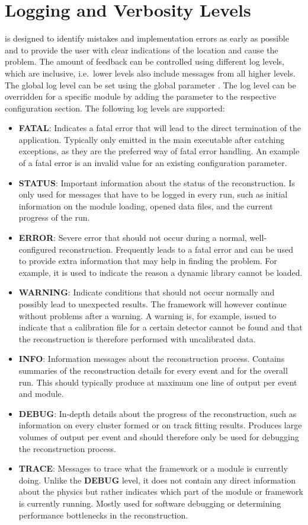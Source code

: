 \section{Logging and Verbosity Levels}
\label{sec:logging_verbosity}
\corry is designed to identify mistakes and implementation errors as early as possible and to provide the user with clear indications of the location and cause the problem.
The amount of feedback can be controlled using different log levels, which are inclusive, i.e.\ lower levels also include messages from all higher levels.
The global log level can be set using the global parameter .
The log level can be overridden for a specific module by adding the  parameter to the respective configuration section.
The following log levels are supported:
\begin{itemize}
\item \textbf{FATAL}: Indicates a fatal error that will lead to the direct termination of the application.
Typically only emitted in the main executable after catching exceptions, as they are the preferred way of fatal error handling.
An example of a fatal error is an invalid value for an existing configuration parameter.
\item \textbf{STATUS}: Important information about the status of the reconstruction.
Is only used for messages that have to be logged in every run, such as initial information on the module loading, opened data files, and the current progress of the run.
\item \textbf{ERROR}: Severe error that should not occur during a normal, well-configured reconstruction.
Frequently leads to a fatal error and can be used to provide extra information that may help in finding the problem. For example, it is used to indicate the reason a dynamic library cannot be loaded.
\item \textbf{WARNING}: Indicate conditions that should not occur normally and possibly lead to unexpected results.
The framework will however continue without problems after a warning.
A warning is, for example, issued to indicate that a calibration file for a certain detector cannot be found and that the reconstruction is therefore performed with uncalibrated data.
\item \textbf{INFO}: Information messages about the reconstruction process.
Contains summaries of the reconstruction details for every event and for the overall run.
This should typically produce at maximum one line of output per event and module.
\item \textbf{DEBUG}: In-depth details about the progress of the reconstruction, such as information on every cluster formed or on track fitting results.
Produces large volumes of output per event and should therefore only be used for debugging the reconstruction process.
\item \textbf{TRACE}: Messages to trace what the framework or a module is currently doing.
Unlike the \textbf{DEBUG} level, it does not contain any direct information about the physics but rather indicates which part of the module or framework is currently running.
Mostly used for software debugging or determining performance bottlenecks in the reconstruction.
\end{itemize}

